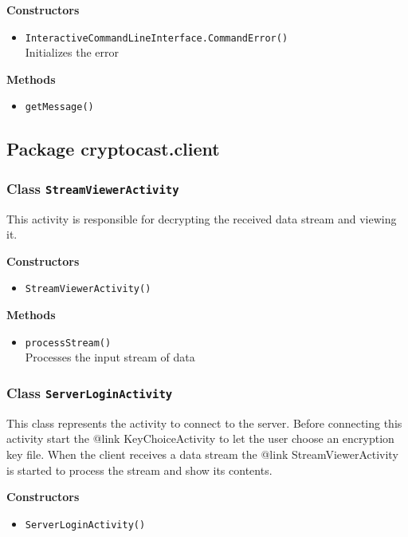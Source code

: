 \textbf{Constructors}
\begin{itemize}
\item \lstinline|InteractiveCommandLineInterface.CommandError()| \\
Initializes the error

\end{itemize}

\textbf{Methods}
\begin{itemize}
\item \lstinline|getMessage()| \\


\end{itemize}


\subsection{Package cryptocast.client}
\subsubsection{Class \lstinline|StreamViewerActivity|}
This activity is responsible for decrypting the received data
 stream and viewing it.

\textbf{Constructors}
\begin{itemize}
\item \lstinline|StreamViewerActivity()| \\


\end{itemize}

\textbf{Methods}
\begin{itemize}
\item \lstinline|processStream()| \\
Processes the input stream of data

\end{itemize}

\subsubsection{Class \lstinline|ServerLoginActivity|}
This class represents the activity to connect to the server.
 Before connecting this activity start the {@link KeyChoiceActivity} to 
 let the user choose an encryption key file. When the client receives a 
 data stream the {@link StreamViewerActivity} is started to process the 
 stream and show its contents.

\textbf{Constructors}
\begin{itemize}
\item \lstinline|ServerLoginActivity()| \\


\end{itemize}

